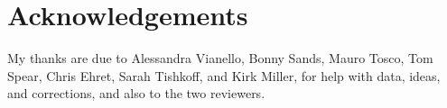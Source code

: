 \documentclass[output=paper
,newtxmath
,modfonts
,nonflat]{langsci/langscibook}
\begin{document}
\section{Acknowledgements} My thanks are due to Alessandra Vianello, Bonny Sands, Mauro Tosco, Tom Spear, Chris Ehret, Sarah Tishkoff, and Kirk Miller, for help with data, ideas, and corrections, and also to the two reviewers.

\end{document}
